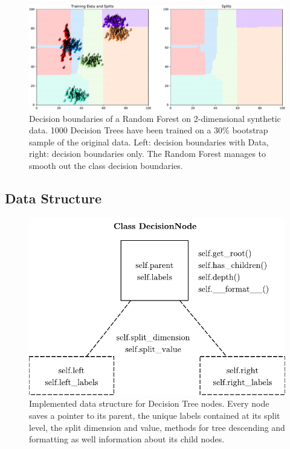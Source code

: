 \documentclass[10pt]{article}
\begin{document}
\begin{figure}[H]
    \centering
    \includegraphics[width=\textwidth]{rf}
    \caption{Decision boundaries of a Random Forest on 2-dimensional synthetic data. 1000 Decision Trees have been trained on a 30\% bootstrap sample of the original data. Left: decision boundaries with Data, right: decision boundaries only. The Random Forest manages to smooth  out the class decision boundaries.}
    \label{fig:rf}
\end{figure}

\subsection{Data Structure}
\begin{figure}[H]
    \centering
    \includegraphics[width=.6\textwidth]{decision-node}
    \caption{Implemented data structure for Decision Tree nodes. Every node saves a pointer to its parent, the unique labels contained at its split level, the split dimension and value, methods for tree descending and formatting as well information about its child nodes.}
    \label{fig:decision-node}
\end{figure}
\end{document}
